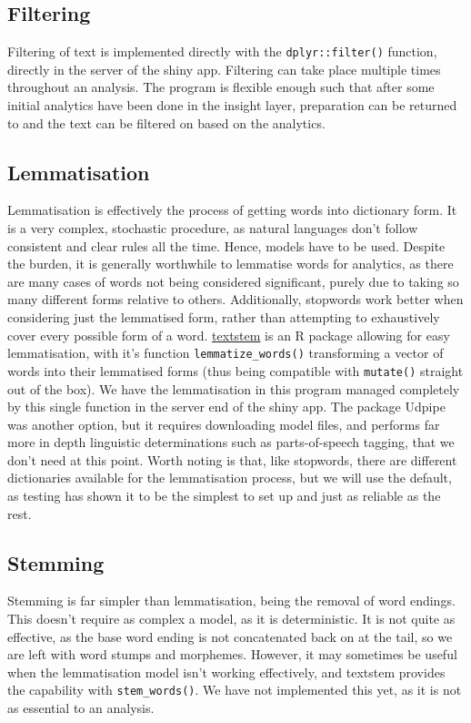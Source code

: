 \documentclass[11pt, a4paper, oneside]{report}
\begin{document}
\subsection{Filtering}
\label{sec:orge4eec20}
Filtering of text is implemented directly with the
\texttt{dplyr::filter()} function, directly in the server of the shiny
app. Filtering can take place multiple times throughout an analysis.
The program is flexible enough such that after some initial analytics
have been done in the insight layer, preparation can be returned
to and the text can be filtered on based on the analytics.
\subsection{Lemmatisation}
\label{sec:org33549e9}
Lemmatisation is effectively the process of getting words into
dictionary form. It is a very complex, stochastic procedure, as
natural languages don't follow consistent and clear rules all the
time. Hence, models have to be used. Despite the burden, it is
generally worthwhile to lemmatise words for analytics, as there are
many cases of words not being considered significant, purely due to
taking so many different forms relative to others. Additionally,
stopwords work better when considering just the lemmatised form,
rather than attempting to exhaustively cover every possible form of a
word. \href{https://github.com/trinker/textstem/}{textstem} is an R
package allowing for easy lemmatisation, with it's function
\texttt{lemmatize_words()} transforming a vector of words into their
lemmatised forms (thus being compatible with \texttt{mutate()} straight
out of the box). We have the lemmatisation in this program managed
completely by this single function in the server end of the shiny app.
The package Udpipe was another option, but it requires downloading
model files, and performs far more in depth linguistic determinations
such as parts-of-speech tagging, that we don't need at this point.
Worth noting is that, like stopwords, there are different dictionaries
available for the lemmatisation process, but we will use the default,
as testing has shown it to be the simplest to set up and just as
reliable as the rest.
\subsection{Stemming}
\label{sec:orgca6bac4}
Stemming is far simpler than lemmatisation, being the removal of word
endings. This doesn't require as complex a model, as it is
deterministic. It is not quite as effective, as the base word ending
is not concatenated back on at the tail, so we are left with word
stumps and morphemes. However, it may sometimes be useful when the
lemmatisation model isn't working effectively, and textstem provides
the capability with \texttt{stem_words()}. We have not implemented this
yet, as it is not as essential to an analysis.
\end{document}
